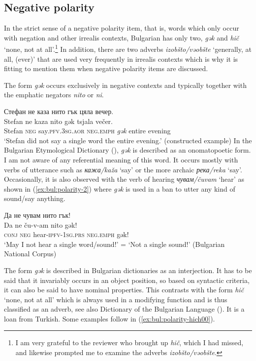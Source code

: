 \documentclass[output=paper,colorlinks=true, citecolor=brown]{langscibook}
\begin{document}
\subsection{Negative polarity} \label{sec:bul:negative.polarity}

In the strict sense of a negative polarity item, that is, words which only occur with negation and other irrealis contexts, Bulgarian has only two, \textit{gək} and \textit{hič} `none, not at all'.\footnote{I am very grateful to the reviewer who brought up \textit{hič}, which I had missed, and likewise prompted me to examine the adverbs \textit{izobšto\slash vəobšte}.} In addition, there are two adverbs \textit{izobšto\slash vəobšte} `generally, at all, (ever)' that are used very frequently in irrealis contexts which is why it is fitting to mention them when negative polarity items are discussed.

The form \textit{gək} occurs exclusively in negative contexts and typically together with the emphatic negators \textit{nito} or \textit{ni}.

\ea Стефан не каза нито гък цяла вечер.\label{ex:bul:polarity-1}\\ 
  	\gll Stefan ne kaza nito gək tsjala večer.\\
     Stefan \textsc{neg} say.\textsc{pfv.3sg.aor} \textsc{neg.emph} \textit{gək} entire evening\\ 
\glt `Stefan did not say a single word the entire evening.' (constructed example) 
\z
In the Bulgarian Etymological Dictionary (\href{http://ibl.bas.bg/lib/ber/#page/394/mode/2up}{\cite[v. 1: 300]{GeorgievIlčev1971}}), \textit{gək} is described as an onomatopoetic form. I am not aware of any referential meaning of this word. It occurs mostly with verbs of utterance such as \textit{кажа/kaža} `say' or the more archaic \textit{река/reka} `say'. Occasionally, it is also observed with the verb of hearing \textit{чувам/čuvam} `hear' as shown in (\ref{ex:bul:polarity-2}) where \textit{gək} is used in a ban to utter any kind of sound/say anything.

\ea Да не чувам нито гък!\label{ex:bul:polarity-2}\\ 
  	\gll Da ne ču-v-am nito gək!\\
     \textsc{conj} \textsc{neg} hear-\textsc{ipfv}-\textsc{1sg.prs} \textsc{neg.emph} gək!\\
\glt `May I not hear a single word/sound!' = `Not a single sound!'  (Bulgarian National Corpus)
\z

The form \textit{gək} is described in Bulgarian dictionaries as an interjection. It has to be said that it invariably occurs in an object position, so based on syntactic criteria, it can also be said to have nominal properties. This contrasts with the form \textit{hič} `none, not at all' which is always used in a modifying function and is thus classified as an adverb, see also Dictionary of the Bulgarian Language (\href{http://ibl.bas.bg/rbe/lang/bg/%D1%85%D0%B8%D1%87/}{\citealt{IBE1993}}).
It is a loan from Turkish. Some examples follow in (\ref{ex:bul:polarity-hich00}).
\end{document}
